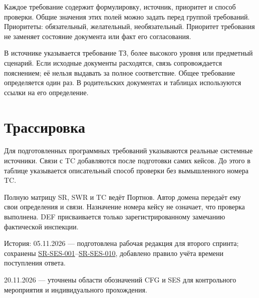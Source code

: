 \documentclass[12pt,a4paper]{article}
\begin{document}
Каждое требование содержит формулировку, источник, приоритет и способ проверки. Общие значения этих полей можно задать перед группой требований. Приоритеты: обязательный, желательный, необязательный. Приоритет требования не заменяет состояние документа или факт его согласования.

В источнике указывается требование ТЗ, более высокого уровня или предметный сценарий. Если исходные документы расходятся, связь сопровождается пояснением; её нельзя выдавать за полное соответствие. Общее требование определяется один раз. В родительских документах и таблицах используются ссылки на его определение.

\section{Трассировка}\label{ux442ux440ux430ux441ux441ux438ux440ux43eux432ux43aux430}

\hypertarget{трассировка}{}

Для подготовленных программных требований указываются реальные системные источники. Связи с TC добавляются после подготовки самих кейсов. До этого в таблице указывается описательный способ проверки без вымышленного номера TC.

Полную матрицу SR, SWR и TC ведёт Портнов. Автор домена передаёт ему свои определения и связи. Назначение номера кейсу не означает, что проверка выполнена. DEF присваивается только зарегистрированному замечанию фактической инспекции.

История: 05.11.2026 --- подготовлена рабочая редакция для второго спринта; сохранены {\href{../04\_Системные\_требования/DOC-05\_Системные\_требования.pdf\#sr-ses-001}{SR-SES-001}}--{\href{../04\_Системные\_требования/DOC-05\_Системные\_требования.pdf\#sr-ses-010}{SR-SES-010}}, добавлено правило учёта времени поступления ответа.

20.11.2026 --- уточнены области обозначений CFG и SES для контрольного мероприятия и индивидуального прохождения.
\end{document}
